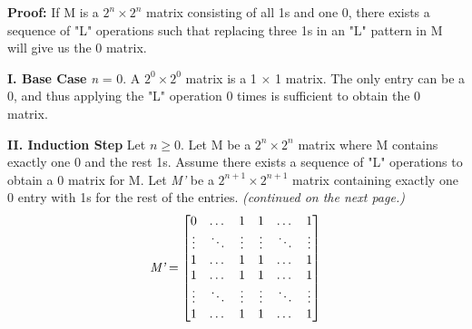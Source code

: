 \documentclass[11pt]{article}
\begin{document}
\begin{flushleft}
		\textbf{Proof:}\newline
		If M is a $2^n \times 2^n$ matrix consisting of all 1s and one 0, there exists a sequence of "L" operations such that replacing three 1s in an "L" pattern in M will give us the 0 matrix. \newline
		
		\textbf{I. Base Case}\newline
		\emph{n} = 0. A $2^0 \times 2^0$ matrix is a 1 $\times$ 1 matrix. The only entry can be a 0, and thus applying the "L" operation 0 times is sufficient to obtain the 0 matrix.\newline 
		
		\textbf{II. Induction Step}\newline
		Let $n \ge 0$. Let M be a $2^n \times 2^n$ matrix where M contains exactly one 0 and the rest 1s. Assume there exists a sequence of "L" operations to obtain a 0 matrix for M. Let \emph{M'} be a $2^{n + 1} \times 2^{n + 1}$ matrix containing exactly one 0 entry with 1s for the rest of the entries.\newline 
		\emph{(continued on the next page.)}
		\newpage
		\[
		\emph{M'} = 
		\begin{bmatrix}
		
			0      & \dots  & 1      & 1      & \dots  & 1       \\
			\vdots & \ddots & \vdots & \vdots & \ddots & \vdots \\
			1      & \dots  & 1      & 1      & \dots  & 1      \\     
			1      & \dots  & 1      & 1      & \dots  & 1       \\
			\vdots & \ddots & \vdots & \vdots & \ddots & \vdots \\
			1      & \dots  & 1      & 1      & \dots  & 1      \\   

		\end{bmatrix}
		\]
		
		
		\vspace{0.2cm}
		
	\end{flushleft}
\end{document}
